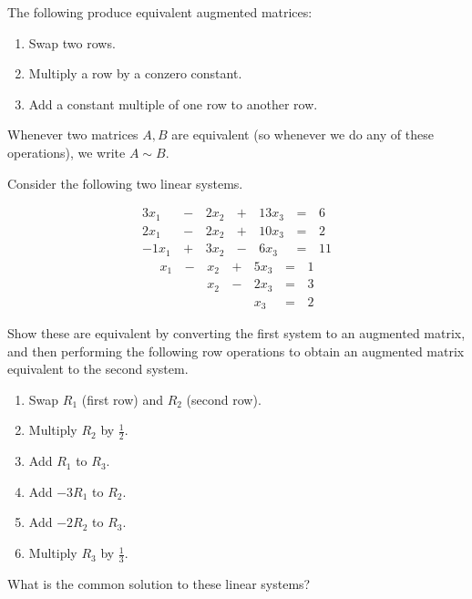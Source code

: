 
\begin{applicationActivities}{2}{5}

\begin{definition}
  The following  produce equivalent
  augmented matrices:
  \begin{enumerate}
    \item Swap two rows.
    \item Multiply a row by a conzero constant.
    \item Add a constant multiple of one row to another row.
  \end{enumerate}
  Whenever two matrices \(A,B\) are equivalent (so whenever we do any of
  these operations), we write \(A\sim B\).
\end{definition}

\begin{activity}{10}
  Consider the following two linear systems.
  \begin{multicols}{2}\noindent
    \begin{alignat*}{4}
      3x_1 &\,-\,& 2x_2 &\,+\,& 13x_3 &\,=\,& 6 \\
      2x_1 &\,-\,& 2x_2 &\,+\,& 10x_3 &\,=\,& 2 \\
     -1x_1 &\,+\,& 3x_2 &\,-\,&  6x_3 &\,=\,& 11
    \end{alignat*}
    \begin{alignat*}{4}
       x_1 &\,-\,&  x_2  &\,+\,&  5x_3 &\,=\,& 1 \\
           &\, \,&  x_2 &\,-\,&  2x_3 &\,=\,& 3 \\
           &\, \,&      &\, \,&   x_3 &\,=\,& 2
    \end{alignat*}
  \end{multicols}
  \begin{subactivity}
    Show these are equivalent by converting the first system to an augmented
    matrix, and then performing the following row operations to obtain
    an augmented matrix equivalent to the second system.
    \begin{multicols}{2}\noindent
    \begin{enumerate}
      \item Swap \(R_1\) (first row) and \(R_2\) (second row).
      \item Multiply \(R_2\) by \(\frac{1}{2}\).
      \item Add \(R_1\) to \(R_3\).
      \item Add \(-3R_1\) to \(R_2\).
      \item Add \(-2R_2\) to \(R_3\).
      \item Multiply \(R_3\) by \(\frac{1}{3}\).
    \end{enumerate}
    \end{multicols}
  \end{subactivity}
  \begin{subactivity}
    What is the common solution to these linear systems?
  \end{subactivity}
\end{activity}


\end{applicationActivities}
